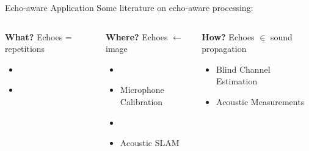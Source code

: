 \begin{frame}[t]{Echo-aware Application \hfill\faBook}
    Some literature on echo-aware processing:
    \begin{columns}[T,onlytextwidth]
        \begin{block}{\textbf{What?}}
            Echoes = repetitions
            \begin{itemize}
                \item {}
                \\{\footnotesize\cite{leglaive2016multichannel}}
                \item {}
                \\{\footnotesize\cite{flanagan1993spatially,dokmanic2015raking,kowalczyk2020raking}}
            \end{itemize}
        \end{block}
        \begin{block}{\textbf{Where?}}
            \small
            Echoes $\gets$ image
            \begin{itemize}
                \item {}
                \\{\footnotesize\cite{ribeiro2010turning,jensen2019method}}
                \item Microphone Calibration
                \\{\footnotesize\cite{dokmanic2015raking,salvati2016sound}}
                \item {}
                \\{\footnotesize\cite{antonacci2012inferences,crocco2017uncalibrated}}
                \item Acoustic SLAM
                \\{\footnotesize\cite{evers2018acoustic,krekovic2016echoslam}}
            \end{itemize}
        \end{block}
        \begin{block}{\textbf{How?}}
            \small
            Echoes $\in$ sound propagation
            \begin{itemize}
                \item Blind Channel Estimation
                \\{\footnotesize\cite{lin2007blind,crocco2017uncalibrated}}
                \item Acoustic Measurements
                \\{\footnotesize\cite{eaton2015ace,kuttruff2016room}}
            \end{itemize}
        \end{block}
    \end{columns}



\end{frame}

